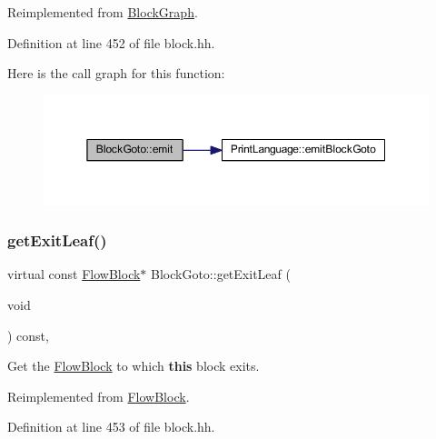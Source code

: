 Reimplemented from \mbox{\hyperlink{class_block_graph_a535d3c7cb13e5e45b6e121b024fa339f}{Block\+Graph}}.



Definition at line 452 of file block.\+hh.

Here is the call graph for this function\+:
\nopagebreak
\begin{figure}[H]
\begin{center}
\leavevmode
\includegraphics[width=350pt]{class_block_goto_a0efc3af4b5fda8bf5f04b0fbca784935_cgraph}
\end{center}
\end{figure}
\mbox{\label{class_block_goto_a18080132d5cd3398eb972335368359e2}} 
\subsubsection{\texorpdfstring{getExitLeaf()}{getExitLeaf()}}
{\footnotesize\ttfamily virtual const \mbox{\hyperlink{class_flow_block}{Flow\+Block}}$\ast$ Block\+Goto\+::get\+Exit\+Leaf (\begin{DoxyParamCaption}\item[{void}]{ }\end{DoxyParamCaption}) const\hspace{0.3cm}{\ttfamily [inline]}, {\ttfamily [virtual]}}



Get the \mbox{\hyperlink{class_flow_block}{Flow\+Block}} to which {\bfseries{this}} block exits. 



Reimplemented from \mbox{\hyperlink{class_flow_block_a611bb926194635a0f5cfc0eb16cabe6a}{Flow\+Block}}.



Definition at line 453 of file block.\+hh.

